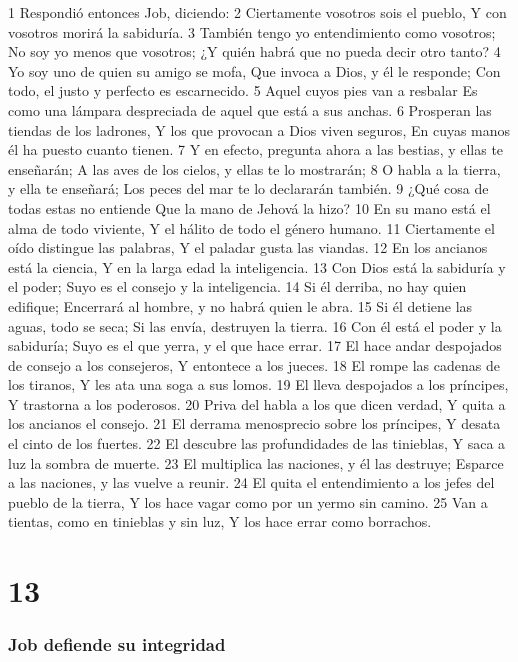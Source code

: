 1 Respondió entonces Job, diciendo:  
2 Ciertamente vosotros sois el pueblo,  
Y con vosotros morirá la sabiduría.  
3 También tengo yo entendimiento como vosotros;  
No soy yo menos que vosotros;  
¿Y quién habrá que no pueda decir otro tanto? 
4 Yo soy uno de quien su amigo se mofa,  
Que invoca a Dios, y él le responde;  
Con todo, el justo y perfecto es escarnecido.  
5 Aquel cuyos pies van a resbalar  
Es como una lámpara despreciada de aquel que está a sus anchas.  
6 Prosperan las tiendas de los ladrones,  
Y los que provocan a Dios viven seguros,  
En cuyas manos él ha puesto cuanto tienen.  
7 Y en efecto, pregunta ahora a las bestias, y ellas te enseñarán;  
A las aves de los cielos, y ellas te lo mostrarán;  
8 O habla a la tierra, y ella te enseñará;  
Los peces del mar te lo declararán también.  
9 ¿Qué cosa de todas estas no entiende  
Que la mano de Jehová la hizo?  
10 En su mano está el alma de todo viviente,  
Y el hálito de todo el género humano.  
11 Ciertamente el oído distingue las palabras,  
Y el paladar gusta las viandas.  
12 En los ancianos está la ciencia,  
Y en la larga edad la inteligencia.  
13 Con Dios está la sabiduría y el poder;  
Suyo es el consejo y la inteligencia.  
14 Si él derriba, no hay quien edifique;  
Encerrará al hombre, y no habrá quien le abra.  
15 Si él detiene las aguas, todo se seca;  
Si las envía, destruyen la tierra.  
16 Con él está el poder y la sabiduría;  
Suyo es el que yerra, y el que hace errar. 
17 El hace andar despojados de consejo a los consejeros,  
Y entontece a los jueces.  
18 El rompe las cadenas de los tiranos,  
Y les ata una soga a sus lomos.  
19 El lleva despojados a los príncipes,  
Y trastorna a los poderosos.  
20 Priva del habla a los que dicen verdad,  
Y quita a los ancianos el consejo. 
21 El derrama menosprecio sobre los príncipes,  
Y desata el cinto de los fuertes.  
22 El descubre las profundidades de las tinieblas,  
Y saca a luz la sombra de muerte.  
23 El multiplica las naciones, y él las destruye;  
Esparce a las naciones, y las vuelve a reunir.  
24 El quita el entendimiento a los jefes del pueblo de la tierra,  
Y los hace vagar como por un yermo sin camino.  
25 Van a tientas, como en tinieblas y sin luz,  
Y los hace errar como borrachos.  

\chapter{13}

\subsection*{Job defiende su integridad}  

